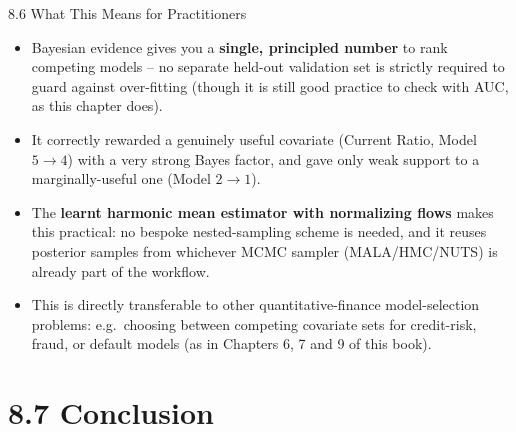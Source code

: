 \documentclass[aspectratio=169,10pt]{beamer}
\begin{document}
\begin{frame}{8.6 What This Means for Practitioners}
\begin{itemize}
  \item Bayesian evidence gives you a \textbf{single, principled number} to rank competing models -- no separate held-out validation set is strictly required to guard against over-fitting (though it is still good practice to check with AUC, as this chapter does).
  \item It correctly rewarded a genuinely useful covariate (Current Ratio, Model $5\to4$) with a very strong Bayes factor, and gave only weak support to a marginally-useful one (Model $2\to1$).
  \item The \textbf{learnt harmonic mean estimator with normalizing flows} makes this practical: no bespoke nested-sampling scheme is needed, and it reuses posterior samples from whichever MCMC sampler (MALA/HMC/NUTS) is already part of the workflow.
  \item This is directly transferable to other quantitative-finance model-selection problems: e.g.\ choosing between competing covariate sets for credit-risk, fraud, or default models (as in Chapters 6, 7 and 9 of this book).
\end{itemize}
\end{frame}

\section{8.7 Conclusion}
\end{document}
